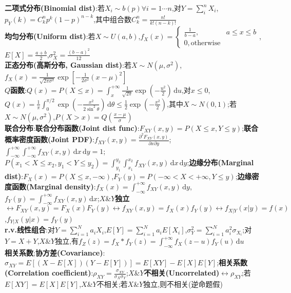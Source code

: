 \documentclass[UTF8,a4paper,10pt]{article}
\begin{document}
\begin{multicols}{2}
    \textbf{二项式分布(Binomial dist)}:若$X_i\sim b(p)\forall i=1\cdots n$,对$Y=\sum_i^nX_i$,$p_Y(k)=C_k^np^k(1-p)^{n-k}$,其中组合数$C_k^n=\frac{n!}{k!(n-k)!}$\\
    \textbf{均匀分布(Uniform dist)}:若$X\sim U(a,b)$,$f_X(x)=\left\{\begin{array}{ll}
        \frac{1}{b-a},&a\leq x\leq b\\
        0,\text{otherwise}
    \end{array}\right.$,$E[X]=\frac{a+b}{2}$,$\sigma_X^2=\frac{(b-a)^2}{12}$\\
    \textbf{正态分布(高斯分布, Gaussian dist)}:若$X\sim N(\mu,\sigma^2)$,$f_X(x)=\frac{1}{\sqrt{2\pi\sigma^2}}\exp[-\frac{1}{2\sigma^2}(x-\mu)^2]$\\
    \textbf{$Q$函数}:$Q(x)=P(X\leq x)=\int_x^{+\infty}\frac{1}{\sqrt{2\pi}}\exp(-\frac{u^2}{2})\,\mathrm{d}u$,对$x\leq 0$,$Q(x)=\frac{1}{\pi}\int_0^{\pi/2}\exp(-\frac{x^2}{2\sin^2\theta})\,\mathrm{d}\theta\leq\frac{1}{2}\exp(-\frac{x^2}{2})$,其中$X\sim N(0,1)$;若$X\sim N(\mu,\sigma^2)$,$P(X>x)=Q(\frac{x-\mu}{\sigma})$\\
    \textbf{联合分布}:\textbf{联合分布函数(Joint dist func)}:$F_{XY}(x,y)=P(X\leq x,Y\leq y)$;\textbf{联合概率密度函数(Joint PDF)}:$f_{XY}(x,y)=\frac{\partial^2F_{XY}(x,y)}{\partial x\partial y}$;$\int_{-\infty}^{+\infty}\int_{-\infty}^{+\infty}f_{XY}(x,y)\,\mathrm{d}x\,\mathrm{d}y=1$;$P(x_1<X\leq x_2,y_1<Y\leq y_2)=\int_{y_1}^{y_2}\int_{x_1}^{x_2}f_{XY}(x,y)\,\mathrm{d}x\,\mathrm{d}y$;\textbf{边缘分布(Marginal dist)}:$F_X(x)=P(X\leq x,-\infty)$,$F_Y(y)=P(-\infty<X<+\infty,Y\leq y)$;\textbf{边缘密度函数(Marginal density)}:$f_X(x)=\int_{-\infty}^{+\infty}f_{XY}(x,y)\,\mathrm{d}y$,$f_Y(y)=\int_{-\infty}^{+\infty}f_{XY}(x,y)\,\mathrm{d}x$;$X$\&$Y$\textbf{独立}$\leftrightarrow F_{XY}(x,y)=F_X(x)F_Y(y)\leftrightarrow f_{XY}(x,y)=f_X(x)f_Y(y)\leftrightarrow f_{X\vert Y}(x\vert y)=f(x)$,$f_{Y\vert X}(y\vert x)=f_Y(y)$\\
    \textbf{r.v.线性组合}:对$Y=\sum_{i=1}^Na_iX_i$,$E[Y]=\sum_{i=1}^Na_iE[X_i]$,$\sigma_Y^2=\sum_{i=1}^Na_i^2\sigma_{X_i}$;对$Y=X+Y$,$X$\&$Y$独立,有$f_Z(z)=f_X*f_Y(z)=\int_{-\infty}^{+\infty}f_X(z-u)f_Y(u)\,\mathrm{d}u$\\
    \textbf{相关系数};\textbf{协方差(Covariance)}:$\sigma_{XY}=E[(X-E[X])(Y-E[Y])]=E[XY]-E[X]E[Y]$;\textbf{相关系数(Correlation coefficient)}:$\rho_{XY}=\frac{\sigma_{XY}}{\sigma_X\sigma_Y}$;$X$\&$Y$\textbf{不相关(Uncorrelated)}$\leftrightarrow\rho_{XY}$;若$E[XY]=E[X]E[Y]$,$X$\&$Y$不相关;若$X$\&$Y$独立,则不相关(逆命题假)\\

\end{multicols}
\end{document}
